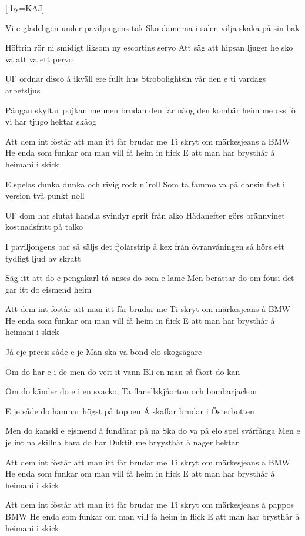 

[ 		%
	by={KAJ}]						%
	

\beginverse*						%
Vi e gladeligen under paviljongens tak
Sko damerna i salen vilja skaka på sin bak

Höftrin rör ni smidigt liksom ny escortins servo
Att säg att hipsan ljuger he sko va att va ett pervo

UF ordnar disco å ikväll ere fullt hus
Strobolightsin vår den e ti vardags arbetsljus

Pängan skyltar pojkan me men brudan den får nåog
den kombär heim me oss fö vi har tjugo hektar skåog
\endverse							%

\beginchorus
Att dem int föstår att man itt får brudar me
Ti skryt om märkesjeans å BMW
He enda som funkar om man vill få heim in flick
E att man har brysthår å heimani i skick
\endchorus

\beginverse*						%
E spelas dunka dunka och rivig rock n´roll
Som tå fammo va på dansin fast i version två punkt noll

UF dom har slutat handla svindyr sprit från alko
Hädanefter görs brännvinet kostnadsfritt på talko

I paviljongens bar så säljs det fjolårstrip å kex
från övranvåningen så hörs ett tydligt ljud av skratt 

Säg itt att do e pengakarl tå anses do som e lame
Men berättar do om föusi det gar itt do eismend heim
\endverse							%

\beginchorus
Att dem int föstår att man itt får brudar me
Ti skryt om märkesjeans å BMW
He enda som funkar om man vill få heim in flick
E att man har brysthår å heimani i skick
\endchorus

\beginverse*						%
Jå eje precis såde e je
Man ska va bond elo skogsägare 

Om do har e i de men do veit it vann
Bli en man så fåort do kan

Om do känder do e i en svacko,
Ta flanellskjåorton och bombarjackon

E je såde do hamnar högst på toppen
Å skaffar brudar i Österbotten

Men do kanski e ejsmend å fundärar på na
Ska do va på elo spel svårfånga
Men e je int na skillna bara do har
Duktit me bryysthår å nager hektar
\endverse							%

\beginchorus
Att dem int föstår att man itt får brudar me
Ti skryt om märkesjeans å BMW
He enda som funkar om man vill få heim in flick
E att man har brysthår å heimani i skick
\endchorus

\beginchorus
Att dem int föstår att man itt får brudar me
Ti skryt om märkesjeans å pappos BMW
He enda som funkar om man vill få heim in flick
E att man har brysthår å heimani i skick
\endchorus

\endsong							%